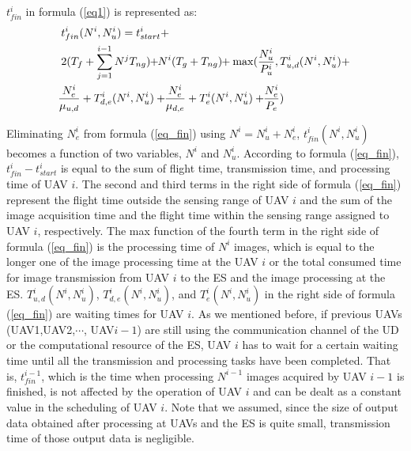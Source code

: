 \documentclass[journal]{IEEEtran}
\begin{document}
$t_{fin}^i$ in formula (\ref{eq1}) is represented as:
\begin{align}
&t_{fin}^i(N^i,N_u^i)=t_{start}^i+\nonumber\\
&2(T_f+\sum_{j=1}^{i-1}{{N^j}T_{ng}})\hspace{-1mm}+\hspace{-1mm}N^i({T_g+T_{ng}})\hspace{-1mm}+\max(\frac{N_u^i}{P_u^i},T_{u,d}^{i}(N^i,N_u^i)+\nonumber\\
&\hspace{-1mm}\frac{N_e^i}{\mu_{u,d}}+T_{d,e}^{i}(N^i,N_u^i)+\hspace{-1mm}\frac{N_e^i}{\mu_{d,e}}+T_{e}^{i}(N^i,N_u^i)+\hspace{-1mm}\frac{N_e^i}{P_e})\label{eq_fin}
\end{align}

Eliminating $N_e^i$ from formula (\ref{eq_fin}) using $N^i=N_u^i+N_e^i$, $t_{fin}^i(N^i,N_u^i)$ becomes a function of two variables, $N^i$ and $N_u^i$.
%
According to formula (\ref{eq_fin}), $t_{fin}^i-t_{start}^i$ is equal to the sum of flight time, transmission time, and processing time of UAV $i$.
%
The second and third terms in the right side of formula (\ref{eq_fin}) represent the flight time outside the sensing range of UAV $i$ and the sum of the image acquisition time and the flight time within the sensing range assigned to UAV $i$, respectively.
%
The max function of the fourth term in the right side of formula (\ref{eq_fin}) is the processing time of $N^i$ images, which is equal to the longer one of the image processing time at the UAV $i$ or the total consumed time for image transmission from UAV $i$ to the ES and the image processing at the ES.
%
$T_{u,d}^{i}(N^i,N_u^i)$, $T_{d,e}^{i}(N^i,N_u^i)$, and $T_e^{i}(N^i,N_u^i)$ in the right side of formula (\ref{eq_fin}) are waiting times for UAV $i$.
%
As we mentioned before, if previous UAVs (UAV1,UAV2,$\cdots$, UAV${i-1}$) are still using the communication channel of the UD or the computational resource of the ES, UAV $i$ has to wait for a certain waiting time until all the transmission and processing tasks have been completed.
%
That is, $t_{fin}^{i-1}$, which is the time when processing $N^{i-1}$ images acquired by UAV $i-1$ is finished, is not affected by the operation of UAV $i$ and can be dealt as a constant value in the scheduling of UAV $i$.
%
Note that we assumed, since the size of output data obtained after processing at UAVs and the ES is quite small, transmission time of those output data is negligible.
\end{document}
